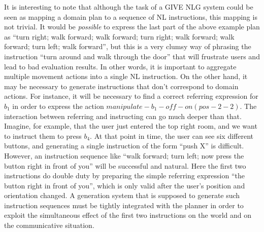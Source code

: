 It is interesting to note that although the task of a GIVE NLG system
could be seen as mapping a domain plan to a sequence of NL
instructions, this mapping is not trivial.  It would be
\emph{possible} to express the last part of the above example plan as
``turn right; walk forward; walk forward; turn right; walk forward;
walk forward; turn left; walk forward'', but this is a very clumsy way
of phrasing the instruction ``turn around and walk through the door''
that will frustrate users and lead to bad evaluation results.  In
other words, it is important to aggregate multiple movement actions
into a single NL instruction.  On the other hand, it may be necessary
to generate instructions that don't correspond to domain actions.  For
instance, it will be necessary to find a correct referring expression
for $b_1$ in order to express the action
$manipulate-b_1-off-on(pos-2-2)$.  The interaction between referring
and instructing can go much deeper than that.  Imagine, for example,
that the user just entered the top right room, and we want to instruct
them to press $b_4$.  At that point in time, the user can see six
different buttons, and generating a single instruction of the form
``push X'' is difficult.  However, an instruction sequence like ``walk
forward; turn left; now press the button right in front of you'' will
be successful and natural.  Here the first two instructions do double
duty by preparing the simple referring expression ``the button right
in front of you'', which is only valid after the user's position and
orientation changed.  A generation system that is supposed to generate
such instruction sequences must be tightly integrated with the planner
in order to exploit the simultaneous effect of the first two
instructions on the world and on the communicative situation.



